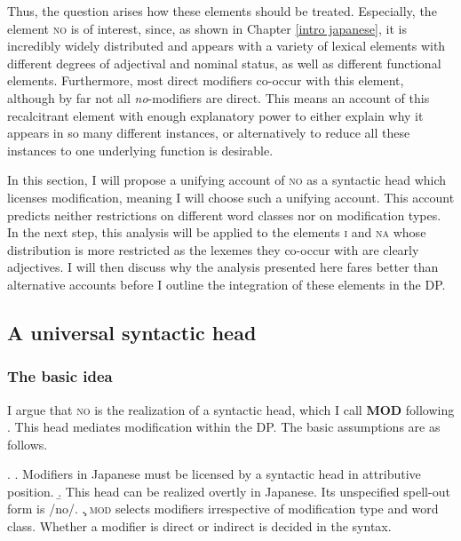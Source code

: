 \documentclass [output=book,colorlinks,citecolor=brown]{langscibook}
\begin{document}
Thus, the question arises how these elements should be treated. Especially, the element \textsc{no} is of interest, since, as shown in Chapter \ref{intro japanese}, it is incredibly widely distributed and appears with a variety of lexical elements with different degrees of adjectival and nominal status, as well as different functional elements. Furthermore, most direct modifiers co-occur with this element, although by far not all \textit{no}-modifiers are direct. This means an account of this recalcitrant element with enough explanatory power to either explain why it appears in so many different instances, or alternatively to reduce all these instances to one underlying function is desirable.

In this section, I will propose a unifying account of \textsc{no} as a syntactic head which licenses modification, meaning I will choose such a unifying account. This account predicts neither restrictions on different word classes nor on modification types. In the next step, this analysis will be applied to the elements \textsc{i} and \textsc{na} whose distribution is more restricted as the lexemes they co-occur with are clearly adjectives. I will then discuss why the analysis presented here fares better than alternative accounts before I outline the integration of these elements in the DP.

\subsection{A universal syntactic head}

\subsubsection{The basic idea}

I argue that \textsc{no} is the realization of a syntactic head, which I call \textbf{MOD} following \citet{rubin:1993:category, rubin:1994:mod, rubin:1996:transparent}. This head mediates modification within the DP. The basic assumptions are as follows. %

\ex. \a. Modifiers in Japanese must be licensed by a syntactic head in attributive position.
\b. This head can be realized overtly in Japanese. Its unspecified spell-out form is /no/.
\c. \textsc{mod} selects modifiers irrespective of modification type and word class. Whether a modifier is direct or indirect is decided in the syntax.
\end{document}
